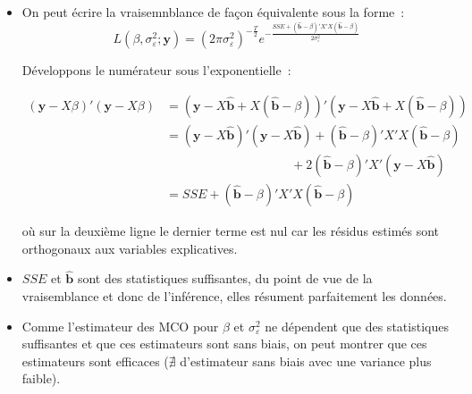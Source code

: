 \documentclass[10pt,a4paper]{article}
\theoremstyle{definition}
\renewcommand{\newline}{\unskip\par\vspace{1.5pt}}
\begin{document}
\begin{notes}

  \begin{itemize}

  \item On peut écrire la vraisemnblance de façon équivalente sous la forme~:
    \[
      L(\beta, \sigma_{\varepsilon}^2; \mathbf y) = (2\pi\sigma_{\varepsilon}^2)^{-\frac{T}{2}}e^{-\frac{SSE + \left(\hat{\mathbf b}-\beta\right)'X'X\left(\hat{\mathbf b}-\beta\right)}{2\sigma_{\varepsilon}^2}}
    \]

    \medskip

    Développons le numérateur sous l'exponentielle~:

    \begin{align*}
      (\mathbf y - X\beta)'(\mathbf y - X\beta) &= \left(\mathbf y - X\hat{\mathbf b} + X(\hat{\mathbf b}-\beta)\right)'\left(\mathbf y - X\hat{\mathbf b} + X(\hat{\mathbf b}-\beta)\right)\\
                                                &= (\mathbf y - X\hat{\mathbf b})'(\mathbf y - X\hat{\mathbf b})
                                                     + (\hat{\mathbf b}-\beta)'X'X(\hat{\mathbf b}-\beta)\\
                                                & \quad\quad\quad\quad\quad\quad\quad\quad\quad\quad   + 2(\hat{\mathbf b}-\beta)'X'(\mathbf y-X\hat{\mathbf b})\\
                                                   &= SSE + (\hat{\mathbf b}-\beta)'X'X(\hat{\mathbf b}-\beta)
      \end{align*}

    où sur la deuxième ligne le dernier terme est nul car les résidus estimés sont orthogonaux aux variables explicatives.\newline


  \item $SSE$ et $\hat{\mathbf b}$ sont des statistiques suffisantes, du point de vue de la vraisemblance et donc de l'inférence, elles résument parfaitement les données.\newline

  \item Comme l'estimateur des MCO pour $\beta$
    et $\sigma_{\varepsilon}^2$ ne dépendent que des statistiques
    suffisantes et que ces estimateurs sont sans biais, on peut
    montrer que ces estimateurs sont efficaces ($\nexists$
    d'estimateur sans biais avec une variance plus faible).

  \end{itemize}

\end{notes}
\end{document}
